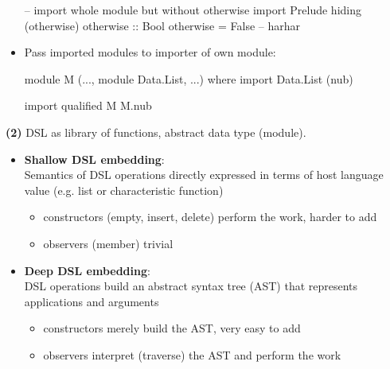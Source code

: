 \begin{itemize}
\begin{Haskell}
-- import whole module but without otherwise
import Prelude hiding (otherwise)
otherwise :: Bool
otherwise = False -- harhar
    \end{Haskell}
    \item Pass imported modules to importer of own module:\\
    \begin{Haskell}
module M (..., module Data.List, ...) where
    import Data.List (nub)
    \end{Haskell}
    \begin{Haskell}
import qualified M
    M.nub
    \end{Haskell}
\end{itemize}


\textbf{(2)}
DSL as library of functions, abstract data type (module).
\begin{itemize}
    \item \textbf{Shallow DSL embedding}:\\
    Semantics of DSL operations directly expressed in terms of host language value (e.g. list or characteristic function)
    \begin{itemize}
        \item constructors (empty, insert, delete) perform the work, harder to add
        \item observers (member) trivial
    \end{itemize}
    \item \textbf{Deep DSL embedding}:\\
    DSL operations build an abstract syntax tree (AST) that represents applications and arguments
    \begin{itemize}
        \item constructors merely build the AST, very easy to add
        \item observers interpret (traverse) the AST and perform the work
    \end{itemize}

\end{itemize}

